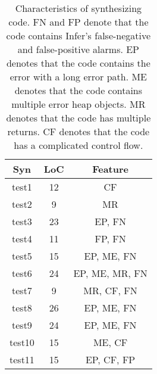 \documentclass[a4paper,11pt,oneside,openany]{book}
\begin{document}
\begin{table}[t]
  \caption[Characteristics of synthesizing code]{Characteristics of synthesizing code. FN and FP denote that the code contains Infer's false-negative and false-positive alarms. EP denotes that the code contains the error with a long error path. ME denotes that the code contains multiple error heap objects. MR denotes that the code has multiple returns. CF denotes that the code has a complicated control flow.}
  \label{syncode}
  \centering
  \begin{tabular}{ccc}
   Syn & LoC  &  Feature \\
    \hline
    test1     & 12  &  CF \\
    test2     & 9   &  MR \\
    test3     & 23  &  EP, FN \\
    test4      & 11 &  FP, FN \\
    test5      & 15 &  EP, ME, FN \\
    test6      & 24 &  EP, ME, MR, FN \\
    test7      & 9   &  MR, CF, FN \\
    test8      & 26 &  EP, ME, FN \\
    test9     & 24  &  EP, ME, FN \\
    test10   & 15  &  ME, CF \\
    test11   & 15  &  EP, CF, FP \\
    \hline
  \end{tabular}
\end{table}
\end{document}
